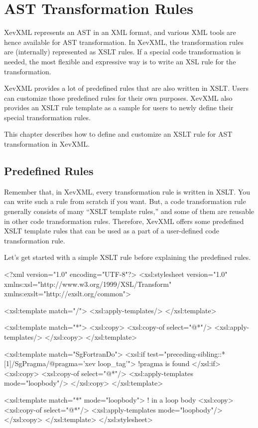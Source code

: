 \chapter{AST Transformation Rules}\label{chap:xslt}

XevXML represents an AST in an XML format, and various XML tools are
hence available for AST transformation. In XevXML, the transformation
rules are (internally) represented as XSLT rules. If a special code
transformation is needed, the most flexible and expressive way is to
write an XSL rule for the transformation.

XevXML provides a lot of predefined rules that are also written in XSLT.
Users can customize those predefined rules for their own
purposes. XevXML also provides an XSLT rule template as a sample for
users to newly define their special transformation rules.

This chapter describes how to define and customize an XSLT rule for AST
transformation in XevXML.


\section{Predefined Rules}\label{sec:predef}
Remember that, in XevXML, every transformation rule is written in
XSLT. You can write such a rule from scratch if you want.  But, a code
transformation rule generally consists of many ``XSLT template rules,''
and some of them are reusable in other code transformation rules.
Therefore, XevXML offers some predefined XSLT template rules that can be
used as a part of a user-defined code transformation rule.

Let's get started with a simple XSLT rule before explaining the
predefined rules.
\begin{framed}
\begin{src}
<?xml version="1.0" encoding="UTF-8"?>
<xsl:stylesheet version="1.0"
   xmlns:xsl="http://www.w3.org/1999/XSL/Transform"
   xmlns:exslt="http://exslt.org/common">

  <xsl:template match="/">
    <xsl:apply-templates/>
  </xsl:template>

  <xsl:template match="*">
    <xsl:copy>
      <xsl:copy-of select="@*"/>
      <xsl:apply-templates/>
    </xsl:copy>
  </xsl:template>

  <xsl:template match="SgFortranDo">
    <xsl:if test="preceding-sibling::*[1]/SgPragma/@pragma='xev loop_tag'">
      !pragma is found
    </xsl:if>
    <xsl:copy>
      <xsl:copy-of select="@*"/>
      <xsl:apply-templates mode="loopbody"/>
    </xsl:copy>
  </xsl:template>

  <xsl:template match="*" mode="loopbody">
    ! in a loop body
    <xsl:copy>
      <xsl:copy-of select="@*"/>
      <xsl:apply-templates mode="loopbody"/>
    </xsl:copy>
  </xsl:template>
</xsl:stylesheet>
\end{src}
\end{framed}


